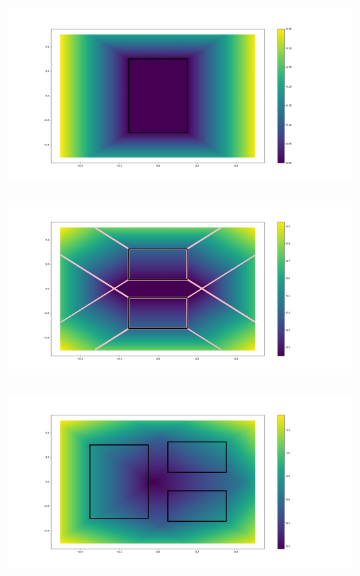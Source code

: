 \begin{figure}[ht]
    \centering
    \captionsetup[subfigure]{justification=centering}
    \begin{subfigure}[t]{0.48\linewidth}
    \includegraphics[trim={5cm 2cm 12cm 2cm},clip,width=\textwidth]{Figures/Chapter_MIP_SL1M/l1_no_cst/grad_simple_0.png}
    \end{subfigure}
    \begin{subfigure}[t]{0.48\linewidth}
    \includegraphics[trim={5cm 2cm 12cm 2cm},clip,width=\textwidth]{Figures/Chapter_MIP_SL1M/l1_no_cst/grad_two_0_1_limit.png}
    \end{subfigure}
    \begin{subfigure}[t]{0.48\linewidth}
    \includegraphics[trim={5cm 2cm 12cm 2cm},clip,width=\textwidth]{Figures/Chapter_MIP_SL1M/l1_no_cst/grad_three_0_1_2.png}

\end{subfigure}
\end{figure}
